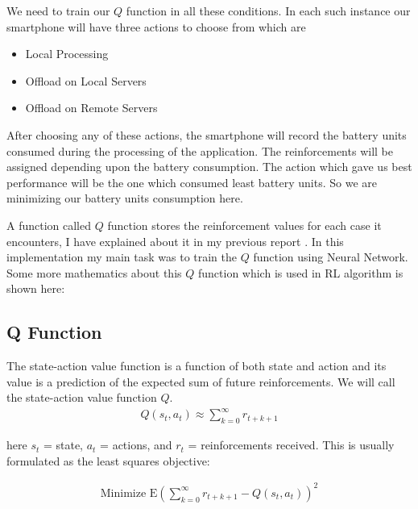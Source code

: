 \documentclass{article}
\begin{document}
We need to train our $Q$ function in all these conditions. In each such instance our smartphone will have three actions to choose from which are
\begin{itemize}
   \item Local Processing
   \item Offload on Local Servers
   \item Offload on Remote Servers
\end{itemize}
After choosing any of these actions, the smartphone will record the battery units consumed during the processing of the application. The reinforcements will be assigned depending upon the battery consumption. The action which gave us best performance will be the one which consumed least battery units. So we are minimizing our battery units consumption here.\par

A function called $Q$ function stores the reinforcement values for each case it encounters, I have explained about it in my previous report \cite{adityaRL}. In this implementation my main task was to train the $Q$ function using Neural Network. Some more mathematics about this $Q$ function which is used in RL algorithm is shown here:
\subsection{Q Function}
The state-action value function is a function of both state and action and its value is a prediction of the expected sum of future reinforcements. We will call the state-action value function $Q$.
\begin{align*}
      Q(s_t,a_t) \approx \sum_{k=0}^\infty r_{t+k+1}
\end{align*}

here $s_t$ = state, $a_t$ = actions, and $r_t$ = reinforcements received.
This is usually formulated as the least squares objective:


    \begin{align*}
      \text{Minimize } \mathrm{E} \left ( \sum_{k=0}^\infty r_{t+k+1} - Q(s_t,a_t)\right )^2
    \end{align*}
    
\end{document}
